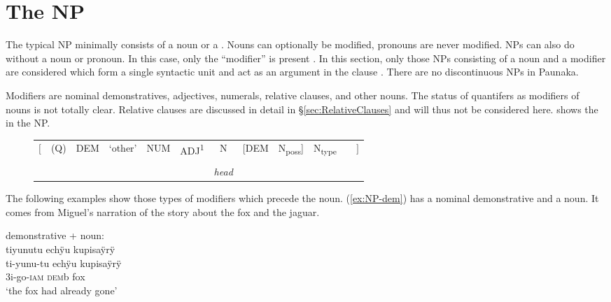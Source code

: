 
\section{The NP}\label{sec:NP}

The typical NP minimally consists of a noun or a . Nouns can optionally be modified, pronouns are never modified. NPs can also do without a noun or pronoun. In this case, only the “modifier” is present \citep[cf.][]{Dryer2004}. In this section, only those NPs consisting of a noun and a modifier are considered which form a single syntactic unit and act as an argument in the clause \citep[cf.][13]{Krasnoukhova2012}. There are no discontinuous NPs in Paunaka.

Modifiers are nominal demonstratives, adjectives, numerals, relative clauses, and other nouns. The status of quantifers as modifiers of nouns is not totally clear. Relative clauses are discussed in detail in §\ref{sec:RelativeClauses} and will thus not be considered here.  shows the  in the NP.


\begin{figure}
\begin{tabularx}{\textwidth}{rQCCCCCCCCQl}
{${\Biggl [}$} & {(Q)} & {DEM} & {‘other’} & {NUM} & {ADJ\textsuperscript{1}} & {N} & [{DEM}  & {N\textsubscript{poss}}] & {N\textsubscript{type}} & {} & {${\Biggl ]}$}\\
 & & &  & & & & & & &  &\\
& & & & & & \textit{head} & & & & & \\
\end{tabularx}
\label{fig:NP}
\end{figure}



The following examples show those types of modifiers which precede the noun. (\ref{ex:NP-dem}) has a nominal demonstrative and a noun. It comes from Miguel’s narration of the story about the fox and the jaguar.

\ea\label{ex:NP-dem}
\begingl
\glpreamble \textup{demonstrative + noun:}\\tiyunutu echÿu kupisaÿrÿ\\
\gla ti-yunu-tu echÿu kupisaÿrÿ\\
\glb 3i-go-\textsc{iam} \textsc{dem}b fox\\
\glft ‘the fox had already gone’
\endgl
\trailingcitation{[jmx-n120429ls-x5.170]}
\xe

